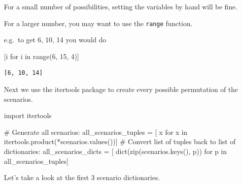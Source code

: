 \documentclass[
  letterpaper,
  DIV=11,
  numbers=noendperiod]{scrreprt}
\newenvironment{Shaded}{\begin{snugshade}}{\end{snugshade}}
\newcommand{\BuiltInTok}[1]{\textcolor[rgb]{0.00,0.23,0.31}{#1}}
\newcommand{\CommentTok}[1]{\textcolor[rgb]{0.37,0.37,0.37}{#1}}
\newcommand{\ControlFlowTok}[1]{\textcolor[rgb]{0.00,0.23,0.31}{#1}}
\newcommand{\DecValTok}[1]{\textcolor[rgb]{0.68,0.00,0.00}{#1}}
\newcommand{\ImportTok}[1]{\textcolor[rgb]{0.00,0.46,0.62}{#1}}
\newcommand{\KeywordTok}[1]{\textcolor[rgb]{0.00,0.23,0.31}{#1}}
\newcommand{\NormalTok}[1]{\textcolor[rgb]{0.00,0.23,0.31}{#1}}
\newcommand{\OperatorTok}[1]{\textcolor[rgb]{0.37,0.37,0.37}{#1}}
\begin{document}
\begin{tcolorbox}[enhanced jigsaw, rightrule=.15mm, colback=white, colframe=quarto-callout-tip-color-frame, colbacktitle=quarto-callout-tip-color!10!white, toprule=.15mm, coltitle=black, opacityback=0, titlerule=0mm, bottomtitle=1mm, breakable, title=\textcolor{quarto-callout-tip-color}{\faLightbulb}\hspace{0.5em}{Tip}, opacitybacktitle=0.6, toptitle=1mm, arc=.35mm, bottomrule=.15mm, leftrule=.75mm, left=2mm]

For a small number of possibilities, setting the variables by hand will
be fine.

For a larger number, you may want to use the \texttt{range} function.

e.g.~to get 6, 10, 14 you would do

\begin{Shaded}
\begin{Highlighting}[]
\NormalTok{[i }\ControlFlowTok{for}\NormalTok{ i }\KeywordTok{in} \BuiltInTok{range}\NormalTok{(}\DecValTok{6}\NormalTok{, }\DecValTok{15}\NormalTok{, }\DecValTok{4}\NormalTok{)]}
\end{Highlighting}
\end{Shaded}

\begin{verbatim}
[6, 10, 14]
\end{verbatim}

\end{tcolorbox}

Next we use the itertools package to create every possible permutation
of the scenarios.

\begin{Shaded}
\begin{Highlighting}[]
\ImportTok{import}\NormalTok{ itertools}

\CommentTok{\# Generate all scenarios:}
\NormalTok{all\_scenarios\_tuples }\OperatorTok{=}\NormalTok{ [}
\NormalTok{    x }\ControlFlowTok{for}\NormalTok{ x }\KeywordTok{in}\NormalTok{ itertools.product(}\OperatorTok{*}\NormalTok{scenarios.values())]}
\CommentTok{\# Convert list of tuples back to list of dictionaries:}
\NormalTok{all\_scenarios\_dicts }\OperatorTok{=}\NormalTok{ [}
    \BuiltInTok{dict}\NormalTok{(}\BuiltInTok{zip}\NormalTok{(scenarios.keys(), p)) }\ControlFlowTok{for}\NormalTok{ p }\KeywordTok{in}\NormalTok{ all\_scenarios\_tuples]}
\end{Highlighting}
\end{Shaded}

Let's take a look at the first 3 scenario dictionaries.
\end{document}
